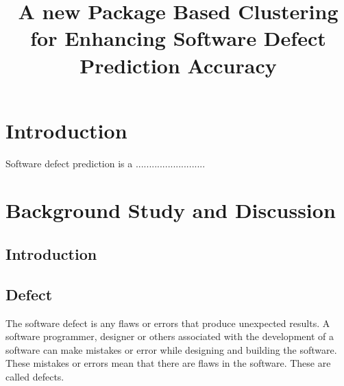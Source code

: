 \documentclass[12pt]{report}
\begin{document}
\doublespacing

\title{ A new Package Based Clustering for Enhancing Software Defect Prediction Accuracy}
\date{}
\maketitle
%
%
%
%
%
%
%
\chapter{Introduction}
Software defect prediction is a ..........................
\chapter{Background Study and Discussion}
\section{Introduction}
\section{Defect }
The software defect is any flaws or errors that produce unexpected results. A software programmer, designer or others associated with the development of a software can make mistakes or error while designing and building the software. These mistakes or errors mean that there are flaws in the software. These are called defects.
\end{document}

